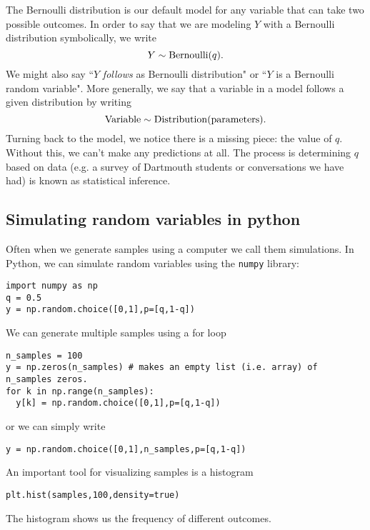 The Bernoulli distribution is our default model for any variable that can take two possible outcomes.  In order to say that we are modeling $Y$ with a Bernoulli distribution symbolically, we write 
\begin{equation}
Y \sim {\rm Bernoulli}(q).
\end{equation}
We might also say ``$Y$ \emph{follows} as Bernoulli distribution" or ``$Y$ is a Bernoulli random variable".
More generally, we say that a variable in a model follows a given distribution by writing 
\begin{equation}
{\rm Variable} \sim {\rm Distribution}({\rm parameters}). 
\end{equation}
  Turning back to the model, we notice there is a missing piece: the value of $q$. Without this, we can't make any predictions at all. The process is determining $q$ based on data (e.g. a survey of Dartmouth students or conversations we have had) is known as {\dfn statistical inference}. 








\subsection{Simulating random variables in python}
 Often when we generate samples using a computer we call them {\dfn simulations}. In Python, we can simulate random variables using the \verb|numpy| library:
\begin{Verbatim}
import numpy as np
q = 0.5 
y = np.random.choice([0,1],p=[q,1-q])
 \end{Verbatim}
 We can generate multiple samples using a for loop
\begin{Verbatim}
n_samples = 100
y = np.zeros(n_samples) # makes an empty list (i.e. array) of n_samples zeros.
for k in np.range(n_samples):
  y[k] = np.random.choice([0,1],p=[q,1-q])
 \end{Verbatim}
 or we can simply write 
\begin{Verbatim}
y = np.random.choice([0,1],n_samples,p=[q,1-q])
 \end{Verbatim}
 An important tool for visualizing samples is a histogram
\begin{Verbatim}
plt.hist(samples,100,density=true)
 \end{Verbatim}
 The histogram shows us the frequency of different outcomes.
 
